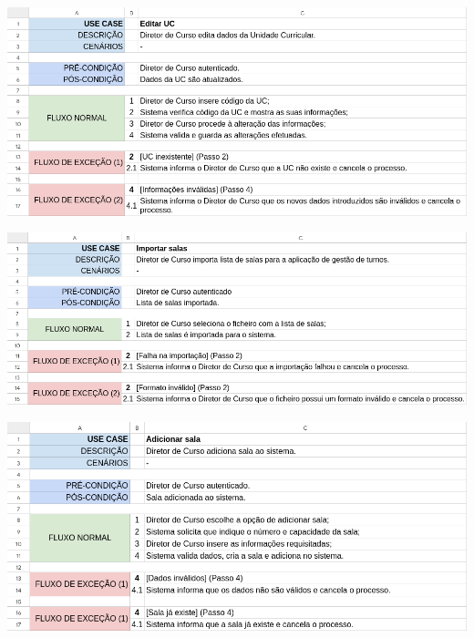 \documentclass[a4paper,12pt]{scrreprt}
\begin{document}
\begin{minipage}{\textwidth}
    \centering
    \includegraphics[width=1\textwidth]{images/use-cases/descriptions/14-Editar UC.png}
    \label{fig:3-14-editar_uc}
\end{minipage}

\begin{minipage}{\textwidth}
    \centering
    \includegraphics[width=1\textwidth]{images/use-cases/descriptions/15-Importar salas.png}
    \label{fig:3-15-importar_salas}
\end{minipage}

\begin{minipage}{\textwidth}
    \centering
    \includegraphics[width=1\textwidth]{images/use-cases/descriptions/16-Adicionar sala.png}
    \label{fig:3-16-adicionar_sala}
\end{minipage}
\end{document}
